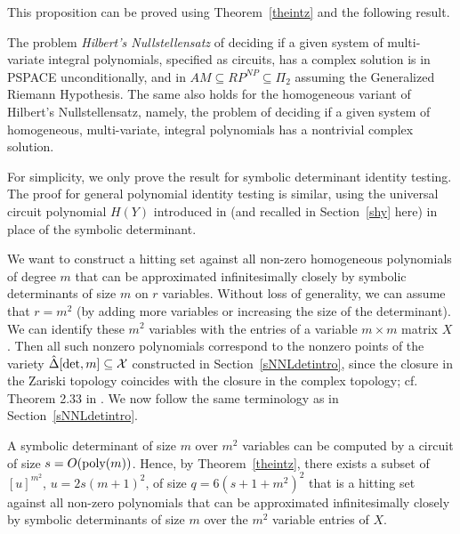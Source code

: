 \documentclass[11pt]{article}
\begin{document}
This proposition can be proved using  Theorem~\ref{theintz} and the following result.

\begin{theorem}  \label{tkoiran}
The problem {\em Hilbert's Nullstellensatz}
of deciding if a given system of multi-variate integral polynomials, specified as 
circuits, has a complex 
solution is in PSPACE unconditionally, and in $AM \subseteq RP^{NP} \subseteq \Pi_2$ assuming the Generalized Riemann Hypothesis. The same also holds 
for the homogeneous variant of Hilbert's Nullstellensatz, 
namely, the problem of
deciding if a given system of homogeneous, multi-variate, integral polynomials has a nontrivial complex solution.
\end{theorem}




For simplicity, we  only prove the result for symbolic determinant identity testing.
The proof for  general polynomial identity testing 
is similar, using the universal circuit polynomial $H(Y)$ introduced in \cite{GCT1} 
(and recalled in Section~\ref{shy} here) in place of the symbolic determinant.

We want to construct a hitting set against all non-zero homogeneous 
polynomials of degree $m$ that can be approximated infinitesimally closely
by symbolic determinants of size $m$ on $r$ variables. Without loss of generality, we can assume that $r=m^2$ (by adding more variables
or increasing the size of the determinant). We can identify these $m^2$ variables with the entries of a variable $m \times m$ 
matrix $X$. Then 
all such nonzero polynomials correspond to the nonzero points of the variety 
$\hat \Delta[\det,m] \subseteq {\cal X}$ constructed in 
Section~\ref{sNNLdetintro}, since the closure in the Zariski topology coincides with the closure
in the complex  topology; cf. Theorem 2.33  in \cite{mumfordalg}. We  now follow the same terminology as in Section~\ref{sNNLdetintro}. 

A symbolic determinant of size $m$ over $m^2$ variables can be computed \cite{malod}
by a  circuit of size $s=O({\mbox {poly}}(m))$. 
Hence, by Theorem~\ref{theintz}, 
there exists a subset of $[u]^{m^2}$, $u=2 s (m+1)^2$,  of size $q=6 (s+1+m^2)^2$ that is  a hitting set 
against all non-zero polynomials that can be approximated infinitesimally closely by 
symbolic determinants of size $m$ over the $m^2$ variable entries of $X$.
\end{document}
